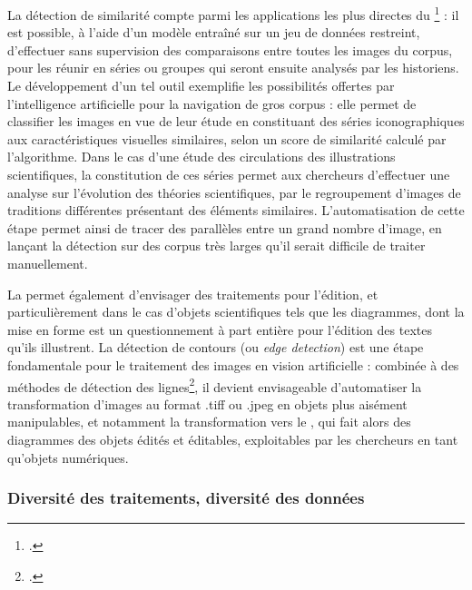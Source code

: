 La détection de similarité compte parmi les applications les plus directes du \dl\footcite{moiraghiExplorerCorpusImages2018} : il est possible, à l'aide d'un modèle entraîné sur un jeu de données restreint, d'effectuer sans supervision des comparaisons entre toutes les images du corpus, pour les réunir en séries ou groupes qui seront ensuite analysés par les historiens. Le développement d'un tel outil exemplifie les possibilités offertes par l'intelligence artificielle pour la navigation de gros corpus : elle permet de classifier les images en vue de leur étude en constituant des séries iconographiques aux caractéristiques visuelles similaires, selon un score de similarité calculé par l'algorithme. Dans le cas d'une étude des circulations des illustrations scientifiques, la constitution de ces séries permet aux chercheurs d'effectuer une analyse sur l'évolution des théories scientifiques, par le regroupement d'images de traditions différentes présentant des éléments similaires. L'automatisation de cette étape permet ainsi de tracer des parallèles entre un grand nombre d'image, en lançant la détection sur des corpus très larges qu'il serait difficile de traiter manuellement.

La \cv permet également d'envisager des traitements pour l'édition, et particulièrement dans le cas d'objets scientifiques tels que les diagrammes, dont la mise en forme est un questionnement à part entière pour l'édition des textes qu'ils illustrent. La détection de contours (ou \textit{edge detection}) est une étape fondamentale pour le traitement des images en vision artificielle : combinée à des méthodes de détection des lignes\footcite{linComprehensiveReviewImage2023}, il devient envisageable d'automatiser la transformation d'images au format .tiff ou .jpeg en objets plus aisément manipulables, et notamment la transformation vers le \svg, qui fait alors des diagrammes des objets édités et éditables, exploitables par les chercheurs en tant qu'objets numériques.

        \subsubsection{Diversité des traitements, diversité des données}

